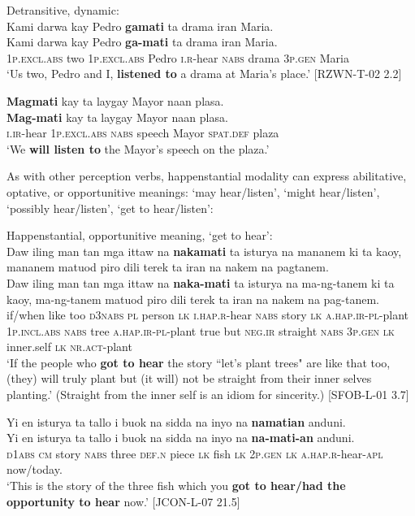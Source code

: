 \ea
Detransitive, dynamic: \\
Kami  darwa  kay  Pedro  \textbf{gamati}  ta  drama  iran  Maria. \\\smallskip
\gll Kami  darwa  kay  Pedro  \textbf{ga-mati}  ta  drama  iran  Maria. \\
1\textsc{p.excl.abs}  two  1\textsc{p.excl.abs}  Pedro  \textsc{i.r}-hear  \textsc{nabs}  drama  3\textsc{p.gen}  Maria \\
\glt ‘Us two, Pedro and I, \textbf{listened to} a drama at Maria’s place.’ [RZWN-T-02 2.2]
\z

\ea
\label{bkm:Ref123365713}
\textbf{Magmati}  kay  ta  laygay  Mayor  naan  plasa. \\\smallskip
\gll \textbf{Mag-mati}  kay  ta  laygay  Mayor  naan  plasa. \\
\textsc{i.ir}-hear  1\textsc{p.excl.abs}  \textsc{nabs}  speech  Mayor  \textsc{spat.def}  plaza \\
\glt ‘We \textbf{will listen to} the Mayor’s speech on the plaza.’
\z

As with other perception verbs, happenstantial modality can express abilitative, optative, or opportunitive meanings: ‘may hear/listen’, ‘might hear/listen’, ‘possibly hear/listen’, ‘get to hear/listen’:

\ea
Happenstantial, opportunitive meaning, ‘get to hear’: \\
Daw  iling  man  tan  mga  ittaw  na  \textbf{nakamati}  ta  isturya na mananem  ki  ta  kaoy,  mananem  matuod piro  dili  terek  ta  iran  na  nakem  na  pagtanem. \\\smallskip
\gll Daw  iling  man  tan  mga  ittaw  na  \textbf{naka-mati}  ta  isturya na ma-ng-tanem  ki  ta  kaoy,  ma-ng-tanem  matuod piro  dili  terek  ta  iran  na  nakem  na  pag-tanem. \\
if/when  like  too  \textsc{d3nabs}  \textsc{pl}  person  \textsc{lk}  \textsc{i.hap.r}-hear  \textsc{nabs}  story \textsc{lk} \textsc{a.hap.ir-pl}-plant  1\textsc{p.incl.abs}  \textsc{nabs}  tree  \textsc{a.hap.ir-pl}-plant  true but  \textsc{neg.ir}  straight  \textsc{nabs}  3\textsc{p.gen}  \textsc{lk}  inner.self  \textsc{lk}  \textsc{nr.act}-plant \\
\glt `If the people who \textbf{got to hear} the story ``let’s plant trees" are like that too, (they) will truly plant but (it will) not be straight from their inner selves planting.’ (Straight from the inner self is an idiom for sincerity.) [SFOB-L-01 3.7]
\z

\ea
Yi  en  isturya  ta  tallo  i  buok  na  sidda  na  inyo  na   \textbf{namatian}  anduni. \\\smallskip
\gll Yi  en  isturya  ta  tallo  i  buok  na  sidda  na  inyo  na   \textbf{na-mati-an}  anduni. \\
\textsc{d1abs}  \textsc{cm}  story  \textsc{nabs}  three  \textsc{def.n}  piece  \textsc{lk}  fish  \textsc{lk}  2\textsc{p.gen}  \textsc{lk}
\textsc{a.hap.r}-hear-\textsc{apl}  now/today. \\
\glt `This is the story of the three fish which you \textbf{got to hear/had the opportunity to hear} now.’ [JCON-L-07 21.5]
\z

